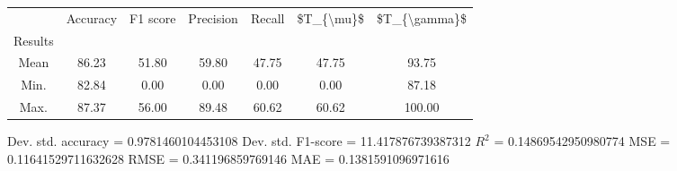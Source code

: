 \begin{tabular}{|c|c|c|c|c|c|c|}
\toprule
{} &  Accuracy &  F1 score &  Precision &  Recall &  \$T\_\{\textbackslash mu\}\$ &  \$T\_\{\textbackslash gamma\}\$ \\
Results &           &           &            &         &            &               \\
\hline
Mean    &     86.23 &     51.80 &      59.80 &   47.75 &      47.75 &         93.75 \\
Min.    &     82.84 &      0.00 &       0.00 &    0.00 &       0.00 &         87.18 \\
Max.    &     87.37 &     56.00 &      89.48 &   60.62 &      60.62 &        100.00 \\
\bottomrule
\end{tabular}

 Dev. std. accuracy = 0.9781460104453108
 Dev. std. F1-score = 11.417876739387312
 $R^2$ = 0.14869542950980774
 MSE = 0.11641529711632628
 RMSE = 0.341196859769146
 MAE = 0.1381591096971616